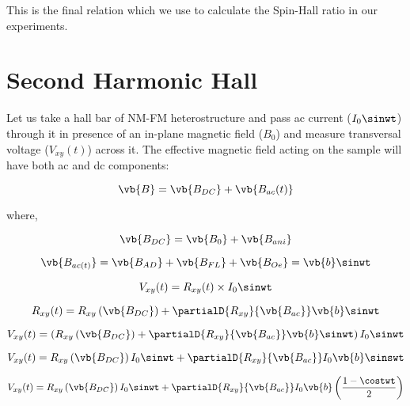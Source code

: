 This is the final relation which we use to calculate the Spin-Hall ratio in our experiments.

\section{Second Harmonic Hall}

Let us take a hall bar of NM-FM heterostructure and pass ac current ($I_{0} \sinwt $) 
through it in presence of an in-plane magnetic field ($B_0$) and measure transversal voltage 
($V_{xy}(t)$) across it. The effective magnetic field acting on the sample will have both ac
 and dc components:

\begin{equation}
    \vb{B} = \vb{B_{DC}} + \vb{B_{ac}(t)}
\end{equation}

where,

\begin{equation}
    \vb{B_{DC}} = \vb{B_0} + \vb{B_{ani}}
\end{equation}

\begin{equation}
    \vb{B_{ac(t)}} = \vb{B_{AD}} + \vb{B_{FL}} + \vb{B_{Oe}} = \vb{b} \sinwt
\end{equation}

\begin{equation}
    V_{xy}(t) = R_{xy}(t) \times I_{0} \sinwt
\end{equation}

\begin{equation}
    R_{xy}(t) = R_{xy} \left( \vb{B_{DC}} \right) + \partialD{R_{xy}}{\vb{B_{ac}}} \vb{b} \sinwt
\end{equation}

\begin{equation}
    V_{xy}(t) = \left( 
        R_{xy} \left( \vb{B_{DC}} \right) +
        \partialD{R_{xy}}{\vb{B_{ac}}} \vb{b} \sinwt
    \right) I_{0} \sinwt
\end{equation}

\begin{equation}
    V_{xy}(t) = R_{xy} \left( \vb{B_{DC}} \right) I_{0} \sinwt + 
    \partialD{R_{xy}}{\vb{B_{ac}}} I_{0} \vb{b} \sinswt
\end{equation}

\begin{equation}
    V_{xy}(t) = R_{xy} \left( \vb{B_{DC}} \right) I_{0} \sinwt + 
    \partialD{R_{xy}}{\vb{B_{ac}}} I_{0} \vb{b} \left( \frac{1 - \costwt}{2} \right)
\end{equation}

